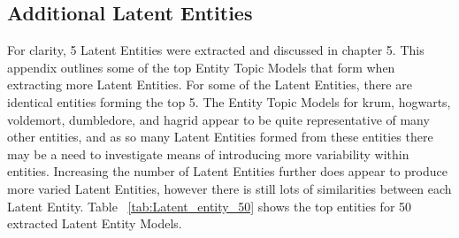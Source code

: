 \documentclass[10pt]{report}
\begin{document}
\begin{appendices}
  \renewcommand{\baselinestretch}{2.0}\normalsize
  \chapter{Additional Latent Entities}

  For clarity, 5 Latent Entities were extracted and discussed in chapter 5. This appendix outlines some of the top Entity Topic Models that form when extracting more Latent Entities. For some of the Latent Entities, there are identical entities forming the top 5. The Entity Topic Models for krum, hogwarts, voldemort, dumbledore, and hagrid appear to be quite representative of many other entities, and as so many Latent Entities formed from these entities there may be a need to investigate means of introducing more variability within entities. Increasing the number of Latent Entities further does appear to produce more varied Latent Entities, however there is still lots of similarities between each Latent Entity. Table ~\ref{tab:Latent_entity_50} shows the top entities for 50 extracted Latent Entity Models.


\end{appendices}
\end{document}
